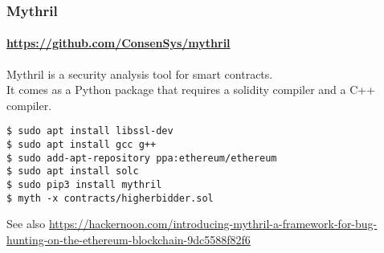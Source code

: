 


\begin{frame}[fragile]
	\frametitle{Mythril}
	\framesubtitle{\url{https://github.com/ConsenSys/mythril}}
	Mythril is a security analysis tool for smart contracts.\\
	It comes as a Python package that requires a solidity compiler and a C++ compiler.
	\vspace{1em}
	\begin{Verbatim}[fontsize=\tiny]
$ sudo apt install libssl-dev
$ sudo apt install gcc g++
$ sudo add-apt-repository ppa:ethereum/ethereum
$ sudo apt install solc
$ sudo pip3 install mythril 
$ myth -x contracts/higherbidder.sol 
	\end{Verbatim}
	\vspace{3em}
	{\footnotesize See also \url{https://hackernoon.com/introducing-mythril-a-framework-for-bug-hunting-on-the-ethereum-blockchain-9dc5588f82f6}}
\end{frame}





